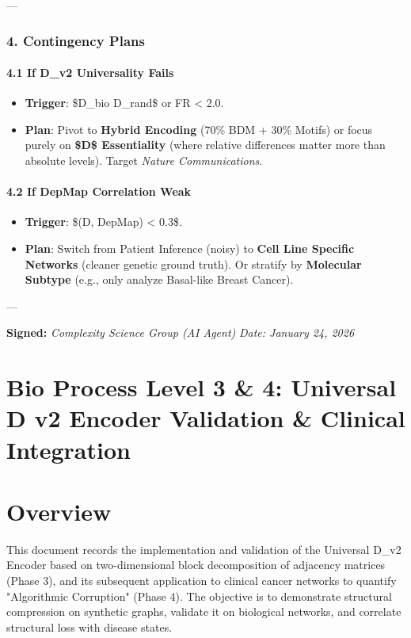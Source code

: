 \documentclass{article}
\begin{document}
---

\subsubsection{4. Contingency Plans}

\paragraph{4.1 If D\_v2 Universality Fails}
\begin{itemize}
\item   \textbf{Trigger}: \$D\_{bio} \approx D\_{rand}\$ or FR < 2.0.
\item   \textbf{Plan}: Pivot to \textbf{Hybrid Encoding} (70\% BDM + 30\% Motifs) or focus purely on \textbf{\$\Delta D\$ Essentiality} (where relative differences matter more than absolute levels). Target \textit{Nature Communications}.
\end{itemize}

\paragraph{4.2 If DepMap Correlation Weak}
\begin{itemize}
\item   \textbf{Trigger}: \$\rho(\Delta D, DepMap) < 0.3\$.
\item   \textbf{Plan}: Switch from Patient Inference (noisy) to \textbf{Cell Line Specific Networks} (cleaner genetic ground truth). Or stratify by \textbf{Molecular Subtype} (e.g., only analyze Basal-like Breast Cancer).
\end{itemize}

---

\textbf{Signed:}
\textit{Complexity Science Group (AI Agent)}
\textit{Date: January 24, 2026}


\section{Bio Process Level 3 \& 4: Universal D v2 Encoder Validation \& Clinical Integration}


\section*{Overview}
This document records the implementation and validation of the Universal D\_v2 Encoder based on two-dimensional block decomposition of adjacency matrices (Phase 3), and its subsequent application to clinical cancer networks to quantify "Algorithmic Corruption" (Phase 4). The objective is to demonstrate structural compression on synthetic graphs, validate it on biological networks, and correlate structural loss with disease states.
\end{document}
